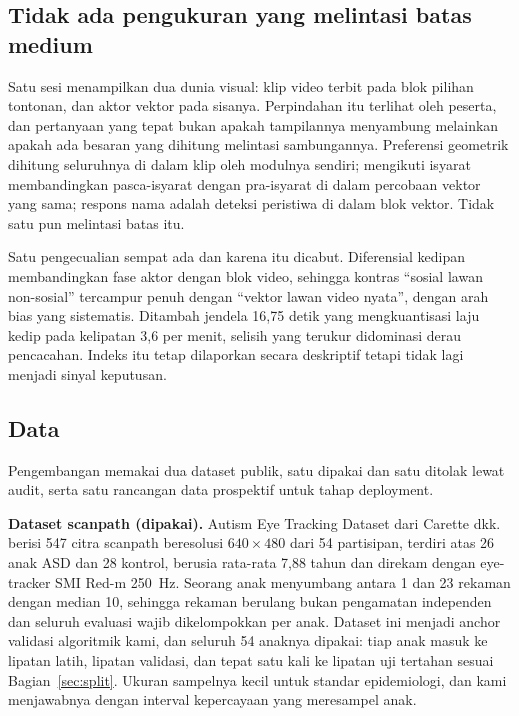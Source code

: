 \documentclass{article}
\begin{document}
\subsection{Tidak ada pengukuran yang melintasi batas medium}

Satu sesi menampilkan dua dunia visual: klip video terbit pada blok pilihan tontonan, dan
aktor vektor pada sisanya. Perpindahan itu terlihat oleh peserta, dan pertanyaan yang
tepat bukan apakah tampilannya menyambung melainkan apakah ada besaran yang dihitung
melintasi sambungannya. Preferensi geometrik dihitung seluruhnya di dalam klip oleh
modulnya sendiri; mengikuti isyarat membandingkan pasca-isyarat dengan pra-isyarat di
dalam percobaan vektor yang sama; respons nama adalah deteksi peristiwa di dalam blok
vektor. Tidak satu pun melintasi batas itu.

Satu pengecualian sempat ada dan karena itu dicabut. Diferensial kedipan membandingkan
fase aktor dengan blok video, sehingga kontras ``sosial lawan non-sosial'' tercampur
penuh dengan ``vektor lawan video nyata'', dengan arah bias yang sistematis. Ditambah
jendela 16,75 detik yang mengkuantisasi laju kedip pada kelipatan 3,6 per menit, selisih
yang terukur didominasi derau pencacahan. Indeks itu tetap dilaporkan secara deskriptif
tetapi tidak lagi menjadi sinyal keputusan.


\subsection{Data}

Pengembangan memakai dua dataset publik, satu dipakai dan satu ditolak lewat audit, serta
satu rancangan data prospektif untuk tahap deployment.

\textbf{Dataset scanpath (dipakai).} Autism Eye Tracking Dataset dari Carette
dkk.~\cite{carette2019} berisi 547 citra scanpath beresolusi $640 \times 480$ dari 54
partisipan, terdiri atas 26 anak ASD dan 28 kontrol, berusia rata-rata 7,88 tahun dan direkam
dengan eye-tracker SMI Red-m 250~Hz. Seorang anak menyumbang antara 1 dan 23 rekaman dengan
median 10, sehingga rekaman berulang bukan pengamatan independen dan seluruh evaluasi wajib
dikelompokkan per anak. Dataset ini menjadi anchor validasi algoritmik kami, dan seluruh 54
anaknya dipakai: tiap anak masuk ke lipatan latih, lipatan validasi, dan tepat satu kali ke
lipatan uji tertahan sesuai Bagian~\ref{sec:split}. Ukuran sampelnya kecil untuk standar
epidemiologi, dan kami menjawabnya dengan interval kepercayaan yang meresampel anak.
\end{document}
